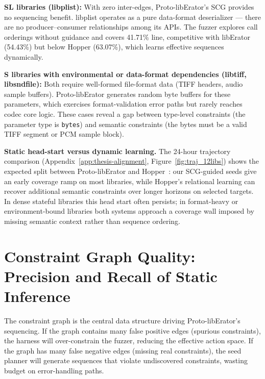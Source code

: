 \textbf{SL libraries (libplist):} With zero inter-edges, Proto-libErator's SCG provides no sequencing benefit. libplist operates as a pure data-format deserializer — there are no producer--consumer relationships among its APIs. The fuzzer explores call orderings without guidance and covers 41.71\% line, competitive with libErator (54.43\%) but below Hopper (63.07\%), which learns effective sequences dynamically.

\textbf{S libraries with environmental or data-format dependencies (libtiff, libsndfile):} Both require well-formed file-format data (TIFF headers, audio sample buffers). Proto-libErator generates random byte buffers for these parameters, which exercises format-validation error paths but rarely reaches codec core logic. These cases reveal a gap between type-level constraints (the parameter type is \texttt{bytes}) and semantic constraints (the bytes must be a valid TIFF segment or PCM sample block).

\textbf{Static head-start versus dynamic learning.} The 24-hour trajectory comparison (Appendix~\ref{app:thesis-alignment}, Figure~\ref{fig:traj_12libs}) shows the expected split between Proto-libErator and Hopper~\cite{hopper_ccs23}: our SCG-guided seeds give an early coverage ramp on most libraries, while Hopper's relational learning can recover additional semantic constraints over longer horizons on selected targets. In dense stateful libraries this head start often persists; in format-heavy or environment-bound libraries both systems approach a coverage wall imposed by missing semantic context rather than sequence ordering.

\section{Constraint Graph Quality: Precision and Recall of Static Inference}
\label{sec:eval_cg_quality}

The constraint graph is the central data structure driving Proto-libErator's sequencing. If the graph contains many false positive edges (spurious constraints), the harness will over-constrain the fuzzer, reducing the effective action space. If the graph has many false negative edges (missing real constraints), the seed planner will generate sequences that violate undiscovered constraints, wasting budget on error-handling paths.

